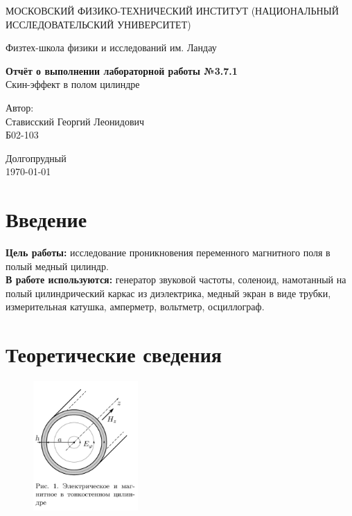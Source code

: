 \documentclass[a4paper,12pt]{article} %
\date{\today}
\begin{document}
\begin{titlepage}
	\begin{center}
		{\large МОСКОВСКИЙ ФИЗИКО-ТЕХНИЧЕСКИЙ ИНСТИТУТ (НАЦИОНАЛЬНЫЙ ИССЛЕДОВАТЕЛЬСКИЙ УНИВЕРСИТЕТ)}
	\end{center}
	\begin{center}
		{\large Физтех-школа физики и исследований им. Ландау}
	\end{center}
	
	
	\vspace{4.5cm}
	{\huge
		\begin{center}
			{\bf Отчёт о выполнении лабораторной работы №3.7.1}\\
			Скин-эффект в полом цилиндре
		\end{center}
	}
	\vspace{2cm}
	\begin{flushright}
		{\LARGE Автор:\\ Стависский Георгий Леонидович \\
			\vspace{0.2cm}
			Б02-103}
	\end{flushright}
	\vspace{8cm}
	\begin{center}
		Долгопрудный\\
		\today
	\end{center}
\end{titlepage}

\section{Введение}

\textbf{Цель работы:} исследование проникновения переменного магнитного поля в полый медный цилиндр.
\\
\textbf{В работе используются:} генератор звуковой частоты, соленоид, намотанный на полый цилиндрический каркас из диэлектрика, медный экран в виде трубки, измерительная катушка, амперметр, вольтметр, осциллограф.

\section{Теоретические сведения}

\begin{figure}
	\includegraphics[width=4cm]{Screenshot_1.png}
	\label{pic:2}
\end{figure}
\end{document}
